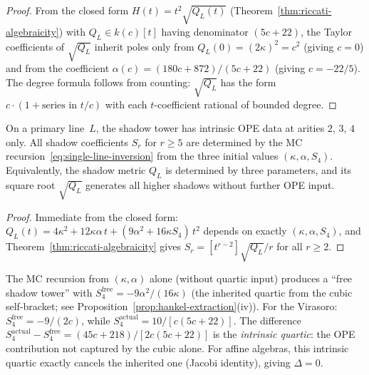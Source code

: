 \begin{proof}
From the closed form $H(t) = t^2\sqrt{Q_L(t)}$ (Theorem~\ref{thm:riccati-algebraicity}) with $Q_L \in k(c)[t]$ having denominator $(5c{+}22)$, the Taylor coefficients of $\sqrt{Q_L}$ inherit poles only from $Q_L(0) = (2\kappa)^2 = c^2$ (giving $c = 0$) and from the coefficient $\alpha(c) = (180c{+}872)/(5c{+}22)$ (giving $c = -22/5$).  The degree formula follows from counting: $\sqrt{Q_L}$ has the form $c \cdot (1 + \text{series in } t/c)$ with each $t$-coefficient rational of bounded degree.
\end{proof}

\begin{proposition}
\label{prop:intrinsic-quartic}
\ClaimStatusProvedHere
{}
On a primary line~$L$, the shadow tower has intrinsic OPE data at arities $2$, $3$, $4$ only.  All shadow coefficients $S_r$ for $r \geq 5$ are determined by the MC recursion~\eqref{eq:single-line-inversion} from the three initial values $(\kappa, \alpha, S_4)$.  Equivalently, the shadow metric $Q_L$ is determined by three parameters, and its square root $\sqrt{Q_L}$ generates all higher shadows without further OPE input.
\end{proposition}

\begin{proof}
Immediate from the closed form: $Q_L(t) = 4\kappa^2 + 12\kappa\alpha\,t + (9\alpha^2 + 16\kappa S_4)\,t^2$ depends on exactly $(\kappa, \alpha, S_4)$, and Theorem~\ref{thm:riccati-algebraicity} gives $S_r = [t^{r-2}]\sqrt{Q_L} / r$ for all $r \geq 2$.
\end{proof}

\begin{remark}
\label{rem:inherited-vs-intrinsic}
The MC recursion from $(\kappa, \alpha)$ alone (without quartic input) produces a ``free shadow tower'' with $S_4^{\mathrm{free}} = -9\alpha^2/(16\kappa)$ (the inherited quartic from the cubic self-bracket; see Proposition~\ref{prop:hankel-extraction}(iv)).  For the Virasoro: $S_4^{\mathrm{free}} = -9/(2c)$, while $S_4^{\mathrm{actual}} = 10/[c(5c{+}22)]$.  The difference $S_4^{\mathrm{actual}} - S_4^{\mathrm{free}} = (45c{+}218)/[2c(5c{+}22)]$ is the \emph{intrinsic quartic}: the OPE contribution not captured by the cubic alone.  For affine algebras, this intrinsic quartic exactly cancels the inherited one (Jacobi identity), giving $\Delta = 0$.
\end{remark}


